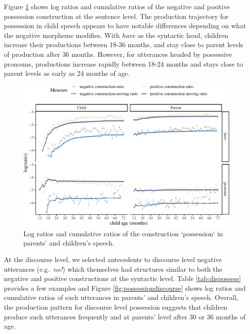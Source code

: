 \documentclass[
  english,
  man,floatsintext]{apa6}
\begin{document}
Figure \ref{fig:possession} shows log ratios and cumulative ratios of the negative and positive possession construction at the sentence level. The production trajectory for possession in child speech appears to have notable differences depending on what the negative morpheme modifies. With \emph{have} as the syntactic head, children increase their productions between 18-36 months, and stay close to parent levels of production after 36 months. However, for utterances headed by possessive pronouns, productions increase rapidly between 18-24 months and stays close to parent levels as early as 24 months of age.

\begin{figure}[H]

{\centering \includegraphics{neg_construction_article_files/figure-latex/possession-1} 

}

\caption{Log ratios and cumulative ratios of the construction `possession` in parents' and children's speech.}\label{fig:possession}
\end{figure}

At the discourse level, we selected antecedents to discourse level negative utterances (e.g.~\emph{no!}) which themselves had structures similar to both the negative and positive constructions at the syntactic level. Table \ref{tab:dispossess} provides a few examples and Figure \ref{fig:possessiondiscourse} shows log ratios and cumulative ratios of such utterances in parents' and children's speech. Overall, the production pattern for discourse level possession suggests that children produce such utterances frequently and at parents' level after 30 or 36 months of age.
\end{document}
